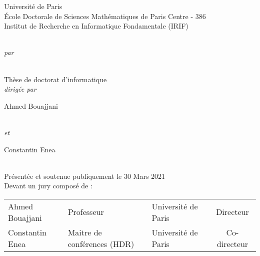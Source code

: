 
\begin{titlepage}
  \makeatletter
  \begin{center}
    Université de Paris\\
    École Doctorale de Sciences Mathématiques de Paris Centre - 386\\
    Institut de Recherche en Informatique Fondamentale (IRIF)\\
    \vspace{1cm}
    \begin{Huge}
      \@title
    \end{Huge}\\[0.1cm]
    \emph{par}\\
    \vspace{0.1cm}
    \begin{Large}\@author\end{Large}\\
    \vspace{1cm}
    Thèse de doctorat d’informatique\\
    \vspace{1cm}
    \emph{dirigée par}\\
    \vspace{0.1cm}
    \begin{Large}Ahmed Bouajjani\end{Large}\\
    \emph{et}\\
    \begin{Large}Constantin Enea\end{Large}\\
    \vspace{1cm}
    Présentée et soutenue publiquement le 30 Mars 2021\\
    \vspace{0.1cm}
    Devant un jury composé de :\\
    \vspace{0.5cm}
    \begin{tabular}{lp{9em}p{12em}c}
    Ahmed Bouajjani & Professeur & Université de Paris & Directeur\\
    Constantin Enea & Maitre de conférences (HDR) & Université de Paris & Co-directeur\\

\end{tabular}
\end{center}
\end{titlepage}
